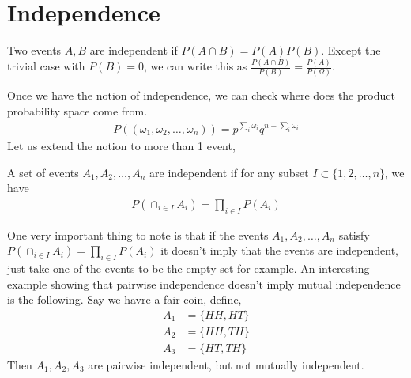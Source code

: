 \section{Independence}
\begin{definition}
    Two events $A,B$ are independent if $P(A \cap B)=P(A)P(B)$. Except the trivial case with $P(B)=0$, we can write this as $\frac{P(A \cap B)}{P(B)}=\frac{P(A)}{P(\Omega)}.$
\end{definition}
Once we have the notion of independence, we can check where does the product probability space come from.
\begin{align}
    P((\omega_1,\omega_2,\ldots,\omega_n))=p^{\sum_i{\omega_i}}q^{n-\sum_i{\omega_i}}
\end{align}
Let us extend the notion to more than 1 event,
\begin{definition}
    A set of events $A_1,A_2,\ldots,A_n$ are independent if for any subset $I \subset \{1,2,\ldots,n\}$, we have
    \begin{align}
        P(\cap_{i \in I}{A_i})=\prod_{i \in I}{P(A_i)}
    \end{align}
\end{definition}
One very important thing to note is that if the events $A_1,A_2,\ldots, A_n$ satisfy $P(\cap_{i \in I}{A_i})=\prod_{i \in I}{P(A_i)}$ it doesn't imply that the events are independent, just take one of the events to be the empty set for example.
An interesting example showing that pairwise independence doesn't imply mutual independence is the following. Say we havre a fair coin, define,
\begin{align*}
    A_1&=\{HH,HT\} \\
    A_2&=\{HH,TH\} \\
    A_3&=\{HT,TH\}
\end{align*}
Then $A_1,A_2,A_3$ are pairwise independent, but not mutually independent.
